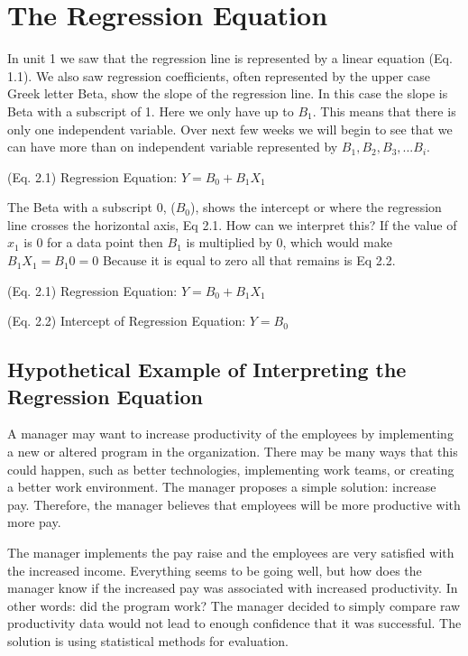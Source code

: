 \documentclass[]{book}
\theoremstyle{definition}
\theoremstyle{definition}
\theoremstyle{definition}
\theoremstyle{remark}
\begin{document}
\hypertarget{the-regression-equation}{%
\section{The Regression Equation}\label{the-regression-equation}}

In unit 1 we saw that the regression line is represented by a linear
equation (Eq. 1.1). We also saw regression coefficients, often
represented by the upper case Greek letter Beta, show the slope of the
regression line. In this case the slope is Beta with a subscript of 1.
Here we only have up to \(B_{1}\). This means that there is only one
independent variable. Over next few weeks we will begin to see that we
can have more than on independent variable represented by
\(B_{1}, B_{2}, B_{3},...B_{i}\).

(Eq. 2.1) Regression Equation: \(Y = B_{0} + B_{1}X_{1}\)

The Beta with a subscript 0, (\(B_{0}\)), shows the intercept or where
the regression line crosses the horizontal axis, Eq 2.1. How can we
interpret this? If the value of \(x_1\) is 0 for a data point then
\(B_{1}\) is multiplied by 0, which would make \(B_{1}X_1 = B_{1}0 = 0\)
Because it is equal to zero all that remains is Eq 2.2.

(Eq. 2.1) Regression Equation: \(Y = B_{0} + B_{1}X_{1}\)

(Eq. 2.2) Intercept of Regression Equation: \(Y = B_{0}\)

\hypertarget{hypothetical-example-of-interpreting-the-regression-equation}{%
\subsection{Hypothetical Example of Interpreting the Regression
Equation}\label{hypothetical-example-of-interpreting-the-regression-equation}}

A manager may want to increase productivity of the employees by
implementing a new or altered program in the organization. There may be
many ways that this could happen, such as better technologies,
implementing work teams, or creating a better work environment. The
manager proposes a simple solution: increase pay. Therefore, the manager
believes that employees will be more productive with more pay.

The manager implements the pay raise and the employees are very
satisfied with the increased income. Everything seems to be going well,
but how does the manager know if the increased pay was associated with
increased productivity. In other words: did the program work? The
manager decided to simply compare raw productivity data would not lead
to enough confidence that it was successful. The solution is using
statistical methods for evaluation.
\end{document}
